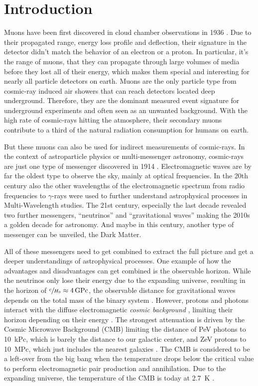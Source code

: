 \chapter{Introduction}

Muons have been first discovered in cloud chamber observations in 1936 \cite{Anderson36Muon}.
Due to their propagated range, energy loss profile and deflection, their signature in the detector didn't match the behavior of an electron or a proton.
In particular, it's the range of muons, that they can propagate through large volumes of media before they lost all of their energy, which makes them special and interesting for nearly all particle detectors on earth.
Muons are the only particle type from cosmic-ray induced air showers that can reach detectors located deep underground.
Therefore, they are the dominant measured event signature for underground experiments and often seen as an unwanted background.
With the high rate of cosmic-rays hitting the atmosphere, their secondary muons contribute to a third of the natural radiation consumption for humans on earth.

But these muons can also be used for indirect measurements of cosmic-rays.
In the context of astroparticle physics or multi-messenger astronomy, cosmic-rays are just one type of messenger discovered in 1914 \cite{Hess12CRbirth}.
Electromagnetic waves are by far the oldest type to observe the sky, mainly at optical frequencies.
In the 20th century also the other wavelengths of the electromagnetic spectrum from radio frequencies to $\gamma$-rays were used to further understand astrophysical processes in Multi-Wavelength studies.
The 21st century, especially the last decade revealed two further messengers, \enquote{neutrinos} and \enquote{gravitational waves} making the 2010s a golden decade for astronomy.
And maybe in this century, another type of messenger can be unveiled, the Dark Matter.

All of these messengers need to get combined to extract the full picture and get a deeper understandings of astrophysical processes.
One example of how the advantages and disadvantages can get combined is the observable horizon.
While the neutrinos only lose their energy due to the expanding universe, resulting in the horizon of $\sfrac{c}{H_0}\approx\SI{4}{GPc}$, the observable distance for gravitational waves depends on the total mass of the binary system \cite{LIGO20WhitePaper}.
However, protons and photons interact with the diffuse electromagnetic \textit{cosmic background} \cite{Hill18CosmicBg}, limiting their horizon depending on their energy \cite{Desiati06}.
The strongest attenuation is driven by the Cosmic Microwave Background (CMB) limiting the distance of PeV photons to \SI{10}{kPc}, which is barely the distance to our galactic center, and ZeV protons to \SI{10}{MPc}, which just includes the nearest galaxies \cite{DeAngelis13Horizon}.
The CMB is considered to be a left-over from the big bang when the temperature drops below the critical value to perform electromagnetic pair production and annihilation.
Due to the expanding universe, the temperature of the CMB is today at \SI{2.7}{K} \cite{PDG20}.

